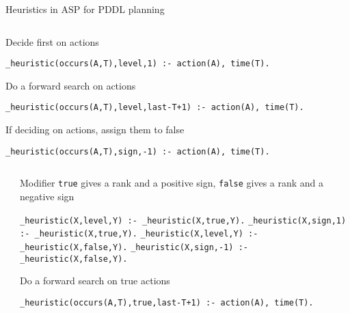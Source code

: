 \begin{block}{Heuristics in ASP for PDDL planning}
\begin{columns}
\begin{column}{.98\linewidth}
Decide first on actions

\verb|_heuristic(occurs(A,T),level,1) :- action(A), time(T).|

\bigskip \bigskip

Do a forward search on actions

\verb|_heuristic(occurs(A,T),level,last-T+1) :- action(A), time(T).|

\bigskip \bigskip

If deciding on actions, assign them to false

\verb|_heuristic(occurs(A,T),sign,-1) :- action(A), time(T).|


\end{column} \end{columns}

\fourskip 

\begin{columns} \begin{column}{.02\linewidth}\end{column}
\begin{column}{.98\linewidth}

Modifier \verb|true| gives a rank and a positive sign, 
\verb|false| gives a rank and a negative sign

\verb|_heuristic(X,level,Y) :- _heuristic(X,true,Y).|
\verb|_heuristic(X,sign,1)  :- _heuristic(X,true,Y).|
\verb|_heuristic(X,level,Y) :- _heuristic(X,false,Y).|
\verb|_heuristic(X,sign,-1) :- _heuristic(X,false,Y).|

\bigskip \bigskip

Do a forward search on true actions

\verb|_heuristic(occurs(A,T),true,last-T+1) :- action(A), time(T).|





\end{column} \end{columns}


\end{block}




